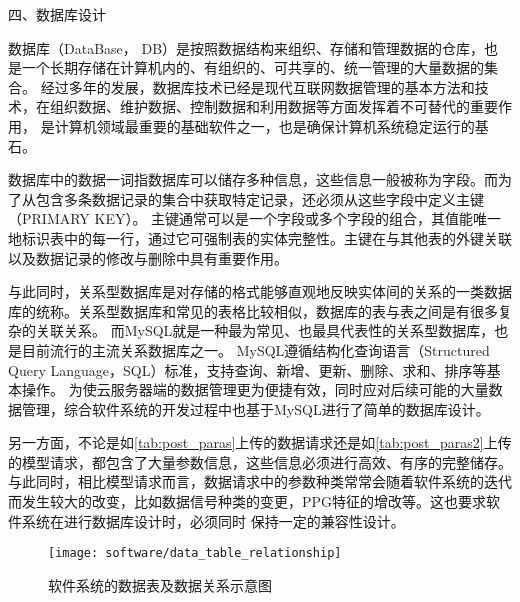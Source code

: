 四、数据库设计

数据库（DataBase， DB）是按照数据结构来组织、存储和管理数据的仓库，也是一个长期存储在计算机内的、有组织的、可共享的、统一管理的大量数据的集合。
经过多年的发展，数据库技术已经是现代互联网数据管理的基本方法和技术，在组织数据、维护数据、控制数据和利用数据等方面发挥着不可替代的重要作用，
是计算机领域最重要的基础软件之一，也是确保计算机系统稳定运行的基石。

数据库中的数据一词指数据库可以储存多种信息，这些信息一般被称为字段。而为了从包含多条数据记录的集合中获取特定记录，还必须从这些字段中定义主键（PRIMARY KEY）。
主键通常可以是一个字段或多个字段的组合，其值能唯一地标识表中的每一行，通过它可强制表的实体完整性。主键在与其他表的外键关联以及数据记录的修改与删除中具有重要作用。

与此同时，关系型数据库是对存储的格式能够直观地反映实体间的关系的一类数据库的统称。关系型数据库和常见的表格比较相似，数据库的表与表之间是有很多复杂的关联关系。
而MySQL就是一种最为常见、也最具代表性的关系型数据库，也是目前流行的主流关系数据库之一。
MySQL遵循结构化查询语言（Structured Query Language，SQL）标准，支持查询、新增、更新、删除、求和、排序等基本操作。
为使云服务器端的数据管理更为便捷有效，同时应对后续可能的大量数据管理，综合软件系统的开发过程中也基于MySQL进行了简单的数据库设计。

另一方面，不论是如\autoref{tab:post_paras}上传的数据请求还是如\autoref{tab:post_paras2}上传的模型请求，都包含了大量参数信息，这些信息必须进行高效、有序的完整储存。
与此同时，相比模型请求而言，数据请求中的参数种类常常会随着软件系统的迭代而发生较大的改变，比如数据信号种类的变更，PPG特征的增改等。这也要求软件系统在进行数据库设计时，必须同时
保持一定的兼容性设计。

\begin{figure}[htbp]
    \centering
    \texttt{[image: software/data\_table\_relationship]}
    \caption{\label{fig:data_table_relationship}软件系统的数据表及数据关系示意图}
\end{figure}


